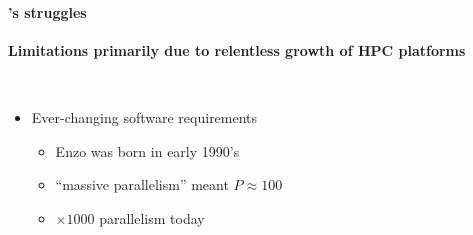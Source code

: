 \begin{frame}[fragile]



\secframetitle{\ssMotivation}
  \framesubtitle{\enzo's struggles}
 \centerline{\textbf{Limitations primarily due to relentless growth of HPC platforms}} \ \\
 \begin{minipage}{3in}
\pause
  \begin{itemize}
   \item Ever-changing software requirements
     \begin{itemize}
\footnotesize
   \item  Enzo was born in early 1990's
   \item ``massive parallelism'' meant $P\approx 100$
   \item $\times 1000$ parallelism today
     \end{itemize}
   

\end{itemize}
\end{minipage}
\end{frame}
